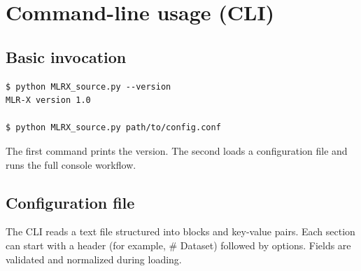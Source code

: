 \documentclass[11pt,a4paper]{article}
\begin{document}
\section{Command-line usage (CLI)}
\subsection{Basic invocation}
\begin{verbatim}
$ python MLRX_source.py --version
MLR-X version 1.0

$ python MLRX_source.py path/to/config.conf
\end{verbatim}
The first command prints the version. The second loads a configuration file and runs the full console workflow.\cite{mlrx-source-main}

\subsection{Configuration file}
The CLI reads a text file structured into blocks and key-value pairs. Each section can start with a header (for example, \# Dataset) followed by options. Fields are validated and normalized during loading.\cite{mlrx-source-config}
\end{document}
